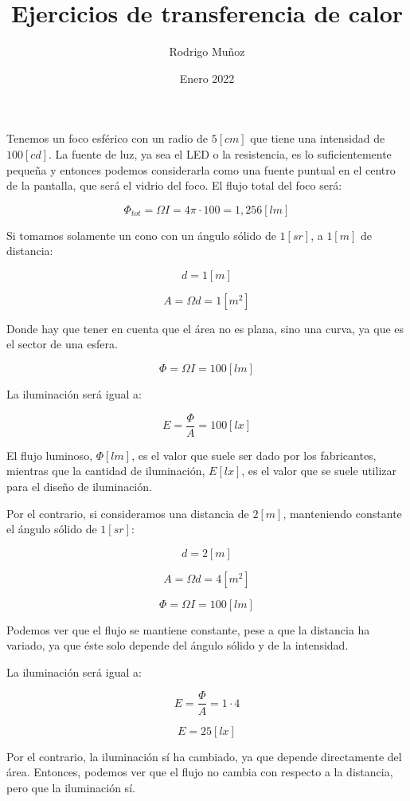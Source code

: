 \documentclass[11pt]{article}
\title{Ejercicios de transferencia de calor}
\author{Rodrigo Muñoz}
\date{Enero 2022}
\begin{document}
\maketitle

Tenemos un foco esférico con un radio de $ 5 \left[ cm \right] $ que tiene una intensidad de $ 100 \left[ cd \right] $. La fuente de luz, ya sea el LED o la resistencia, es lo suficientemente pequeña y entonces podemos considerarla como una fuente puntual en el centro de la pantalla, que será el vidrio del foco. El flujo total del foco será:

\[ \Phi _{ tot } = \Omega I = 4 \pi \cdot 100 = 1, 256 \left[ lm \right] \]

Si tomamos solamente un cono con un ángulo sólido de $ 1 \left[ sr \right] $, a $ 1 \left[ m \right] $ de distancia:

\[ d = 1 \left[ m \right] \]

\[ A = \Omega d = 1 \left[ m^2 \right] \]

Donde hay que tener en cuenta que el área no es plana, sino una curva, ya que es el sector de una esfera.

\[ \Phi = \Omega I = 100 \left[ lm \right] \]

La iluminación será igual a:

\[ E = \frac{ \Phi }{ A } = 100 \left[ lx \right] \]

El flujo luminoso, $ \Phi \left[ lm \right] $, es el valor que suele ser dado por los fabricantes, mientras que la cantidad de iluminación, $ E \left[ lx \right] $, es el valor que se suele utilizar para el diseño de iluminación.

Por el contrario, si consideramos una distancia de $ 2 \left[ m \right] $, manteniendo constante el ángulo sólido de $ 1 \left[ sr \right] $:

\[ d = 2 \left[ m \right] \]

\[ A = \Omega d = 4 \left[ m^2 \right] \]

\[ \Phi = \Omega I = 100 \left[ lm \right] \]

Podemos ver que el flujo se mantiene constante, pese a que la distancia ha variado, ya que éste solo depende del ángulo sólido y de la intensidad.

La iluminación será igual a:

\[ E = \frac{ \Phi }{ A } = 1 \cdot 4 \] 

\[ E = 25 \left[ lx \right] \]

Por el contrario, la iluminación sí ha cambiado, ya que depende directamente del área. Entonces, podemos ver que el flujo no cambia con respecto a la distancia, pero que la iluminación sí.
\end{document}
